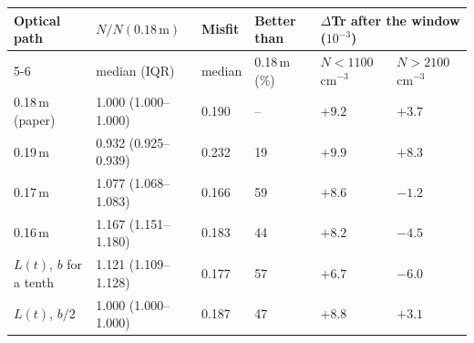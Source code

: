\begin{tabular}{llllll}
\toprule
Optical path & $N/N(0.18\,\mathrm{m})$ & Misfit & Better than & \multicolumn{2}{l}{$\Delta$Tr after the window ($10^{-3}$)} \\
\cmidrule(l){5-6}
 & median (IQR) & median & 0.18\,m (\%) & $N < 1100$\,cm$^{-3}$ & $N > 2100$\,cm$^{-3}$ \\
\midrule
0.18\,m (paper) & 1.000 (1.000--1.000) & 0.190 & -- & $+9.2$ & $+3.7$ \\
0.19\,m & 0.932 (0.925--0.939) & 0.232 & 19 & $+9.9$ & $+8.3$ \\
0.17\,m & 1.077 (1.068--1.083) & 0.166 & 59 & $+8.6$ & $-1.2$ \\
0.16\,m & 1.167 (1.151--1.180) & 0.183 & 44 & $+8.2$ & $-4.5$ \\
$L(t)$, $b$ for a tenth & 1.121 (1.109--1.128) & 0.177 & 57 & $+6.7$ & $-6.0$ \\
$L(t)$, $b/2$ & 1.000 (1.000--1.000) & 0.187 & 47 & $+8.8$ & $+3.1$ \\
\bottomrule
\end{tabular}
